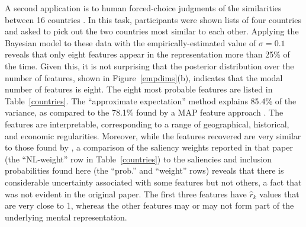 \documentclass[11pt]{article}
\begin{document}
A second application is to human forced-choice judgments of the similarities between 16 countries \cite{navarrol02}. In this task, participants were shown lists of four countries and asked to pick out the two countries most similar to each other. Applying the Bayesian model to these data with the empirically-estimated value of $\sigma=0.1$ reveals that only eight features appear in the representation more than 25\% of the time. Given this, it is not surprising that the posterior distribution over the number of features, shown in Figure~\ref{empdims}(b), indicates that the modal  number of features is eight. The eight most probable features are listed in Table~\ref{countries}. The ``approximate expectation'' method explains 85.4\% of the variance, as compared to the 78.1\% found by a MAP feature approach \cite{navarrol02}. The features are interpretable, corresponding to a range of geographical, historical, and economic regularities. Moreover, while the features recovered are very similar to those found by , a comparison of the saliency weights reported in that paper (the ``NL-weight'' row in Table~\ref{countries}) to the saliencies and inclusion probabilities found here (the ``prob.'' and ``weight'' rows) reveals that there is considerable uncertainty associated with some features but not others, a fact that was not evident in the original paper. The first three features have $\hat{r}_k$ values that are very close to 1, whereas the other features may or may not form part of the underlying mental representation.
\end{document}
